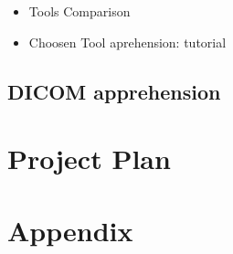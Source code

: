 \documentclass[12pt,twoside]{article}
\begin{document}
\begin{itemize} 
\item Tools Comparison

\item Choosen Tool aprehension: tutorial 
	
\end{itemize}

\subsection{DICOM apprehension}



\clearpage
\section{Project Plan}

\clearpage
\section{Appendix}






\end{document}
